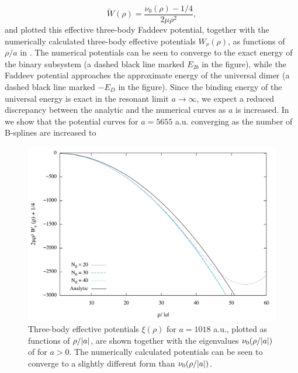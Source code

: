 \begin{equation}
\widetilde{W}(\rho) =\frac{\nu_0(\rho)-1/4}{2\mu \rho^2},
\end{equation}
and plotted this effective three-body Faddeev potential, together with the numerically calculated three-body effective potentials $W_{\nu}(\rho)$, as functions of $\rho/a$ in . The numerical potentials can be seen to converge to the exact energy of the binary subsystem (a dashed black line marked $E_{2b}$ in the figure), while the Faddeev potential approaches the approximate energy of the universal dimer (a dashed black line marked $-E_D$ in the figure). Since the binding energy of the universal energy is exact in the resonant limit $a \rightarrow \infty$, we expect a reduced discrepancy between the analytic and the numerical curves as $a$ is increased. In  we show that the potential curves for $a=5655$ a.u. converging as the number of B-splines are increased to 

\begin{figure}
	\includegraphics[width=\linewidth]{convergence1.pdf}
	\caption{Three-body effective potentials $\xi(\rho)$ for $a=1018$ a.u., plotted as functions of $\rho/\lvert a\rvert$, are shown together with the eigenvalues $\nu_0(\rho/\lvert a\rvert)$ of  for $a>0$. The numerically calculated potentials can be seen to converge to a slightly different form than $\nu_0(\rho/\lvert a\rvert)$.}
	\label{fig:conv_pos1}
\end{figure}

